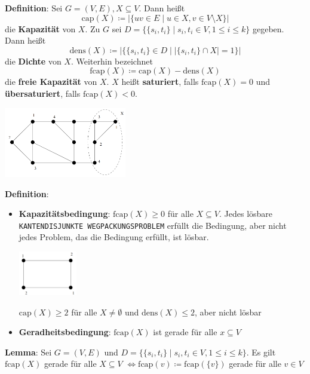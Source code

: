 \textbf{Definition}: Sei $G=(V,E), X\subseteq V$. Dann heißt
$$\text{cap}(X)\coloneqq |\{uv\in E\mid u\in X, v\in V\setminus X\}|$$
die \textbf{Kapazität} von $X$. Zu $G$ sei $D=\{\{s_i,t_i\}\mid s_i,t_i\in V,1\leq i\leq k\}$ gegeben. Dann heißt
$$\text{dens}(X)\coloneqq|\{\{s_i,t_i\}\in D\mid |\{s_i,t_i\}\cap X|=1\}|$$
die \textbf{Dichte} von $X$. Weiterhin bezeichnet
$$\text{fcap}(X)\coloneqq \text{cap}(X)-\text{dens}(X)$$
die \textbf{freie Kapazität} von $X$. $X$ heißt \textbf{saturiert}, falls $\text{fcap}(X)=0$ und \textbf{übersaturiert}, falls $\text{fcap}(X)<0$.
\begin{center}
	\includegraphics[width=0.4\textwidth]{images/s1.png}
\end{center}
\pagebreak
\textbf{Definition}:
\begin{itemize}
	\item \textbf{Kapazitätsbedingung}: $\text{fcap}(X)\geq 0$ für alle $X\subseteq V$. Jedes lösbare \texttt{KANTENDISJUNKTE WEGPACKUNGSPROBLEM} erfüllt die Bedingung, aber nicht jedes Problem, das die Bedingung erfüllt, ist lösbar.
	\begin{center}
		\includegraphics[width=0.2\textwidth]{images/s2.png}
	\end{center}
	$\text{cap}(X)\geq 2$ für alle $X\neq \emptyset$ und $\text{dens}(X)\leq 2$, aber nicht lösbar
	\item \textbf{Geradheitsbedingung}: $\text{fcap}(X)$ ist gerade für alle $x\subseteq V$
\end{itemize}
\bigskip
\textbf{Lemma}: Sei $G=(V,E)$ und $D=\{\{s_i,t_i\}\mid s_i,t_i\in V,1\leq i\leq k\}$. Es gilt $\text{fcap}(X)$ gerade für alle $X\subseteq V$ $\iff \text{fcap}(v)\coloneqq\text{fcap}(\{v\})$ gerade für alle $v\in V$

